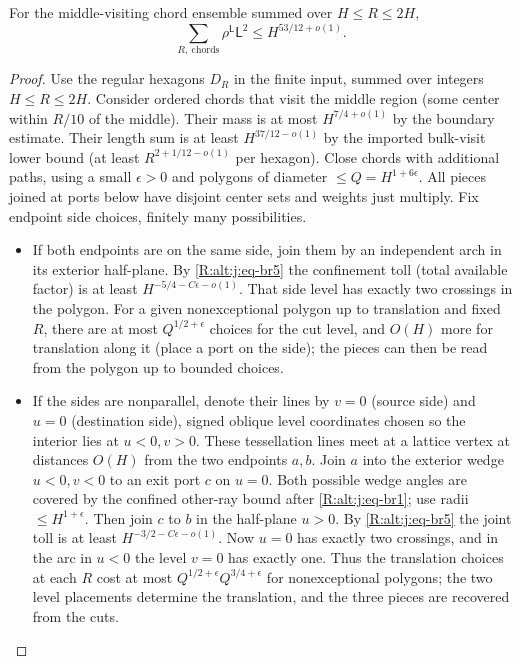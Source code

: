 \begin{lemma}\label{R:signed:chord-square}
For the middle-visiting chord ensemble summed over $H\le R\le2H$,
\begin{equation}\label{R:alt:j:eq-cl1}
 \sum_{R,\ \mathrm{chords}}\rho^{\mathsf L}\mathsf L^2
       \le H^{53/12+o(1)}.
\end{equation}
\end{lemma}
\begin{proof}
Use the regular hexagons $D_R$ in the finite input, summed over integers $H\le R\le2H$. Consider ordered chords that visit the middle region (some center within $R/10$ of the middle). Their mass is at most $H^{7/4+o(1)}$ by the boundary estimate. Their length sum is at least $H^{37/12-o(1)}$ by the imported bulk-visit lower bound (at least $R^{2+1/12-o(1)}$ per hexagon). Close chords with additional paths, using a small $\epsilon>0$ and polygons of diameter $\le Q=H^{1+6\epsilon}$. All pieces joined at ports below have disjoint center sets and weights just multiply. Fix endpoint side choices, finitely many possibilities.

\begin{itemize}
\item If both endpoints are on the same side, join them by an independent arch in its exterior half-plane. By \eqref{R:alt:j:eq-br5} the confinement toll (total available factor) is at least $H^{-5/4-C\epsilon-o(1)}$. That side level has exactly two crossings in the polygon. For a given nonexceptional polygon up to translation and fixed $R$, there are at most $Q^{1/2+\epsilon}$ choices for the cut level, and $O(H)$ more for translation along it (place a port on the side); the pieces can then be read from the polygon up to bounded choices.

\item If the sides are nonparallel, denote their lines by $v=0$ (source side) and $u=0$ (destination side), signed oblique level coordinates chosen so the interior lies at $u<0,v>0$. These tessellation lines meet at a lattice vertex at distances $O(H)$ from the two endpoints $a,b$. Join $a$ into the exterior wedge $u<0,v<0$ to an exit port $c$ on $u=0$. Both possible wedge angles are covered by the confined other-ray bound after \eqref{R:alt:j:eq-br1}; use radii $\le H^{1+\epsilon}$. Then join $c$ to $b$ in the half-plane $u>0$. By \eqref{R:alt:j:eq-br5} the joint toll is at least $H^{-3/2-C\epsilon-o(1)}$. Now $u=0$ has exactly two crossings, and in the arc in $u<0$ the level $v=0$ has exactly one. Thus the translation choices at each $R$ cost at most $Q^{1/2+\epsilon}Q^{3/4+\epsilon}$ for nonexceptional polygons; the two level placements determine the translation, and the three pieces are recovered from the cuts.


\end{itemize}
\end{proof}
